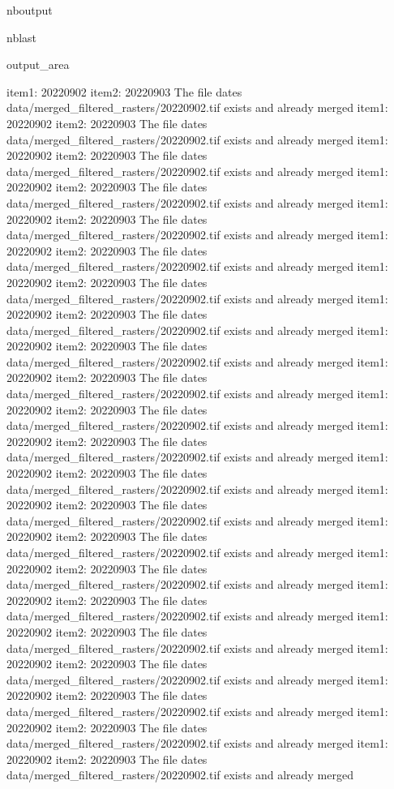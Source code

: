 \documentclass[letterpaper,10pt]{sphinxmanual}
\begin{document}
\begin{sphinxuseclass}{nboutput}
\begin{sphinxuseclass}{nblast}
{\begin{sphinxuseclass}{output_area}
\begin{sphinxuseclass}{}
\begin{sphinxVerbatim}[commandchars=\\\{\}]
item1:  20220902
item2:  20220903
The file dates data/merged\_filtered\_rasters/20220902.tif exists and already merged
item1:  20220902
item2:  20220903
The file dates data/merged\_filtered\_rasters/20220902.tif exists and already merged
item1:  20220902
item2:  20220903
The file dates data/merged\_filtered\_rasters/20220902.tif exists and already merged
item1:  20220902
item2:  20220903
The file dates data/merged\_filtered\_rasters/20220902.tif exists and already merged
item1:  20220902
item2:  20220903
The file dates data/merged\_filtered\_rasters/20220902.tif exists and already merged
item1:  20220902
item2:  20220903
The file dates data/merged\_filtered\_rasters/20220902.tif exists and already merged
item1:  20220902
item2:  20220903
The file dates data/merged\_filtered\_rasters/20220902.tif exists and already merged
item1:  20220902
item2:  20220903
The file dates data/merged\_filtered\_rasters/20220902.tif exists and already merged
item1:  20220902
item2:  20220903
The file dates data/merged\_filtered\_rasters/20220902.tif exists and already merged
item1:  20220902
item2:  20220903
The file dates data/merged\_filtered\_rasters/20220902.tif exists and already merged
item1:  20220902
item2:  20220903
The file dates data/merged\_filtered\_rasters/20220902.tif exists and already merged
item1:  20220902
item2:  20220903
The file dates data/merged\_filtered\_rasters/20220902.tif exists and already merged
item1:  20220902
item2:  20220903
The file dates data/merged\_filtered\_rasters/20220902.tif exists and already merged
item1:  20220902
item2:  20220903
The file dates data/merged\_filtered\_rasters/20220902.tif exists and already merged
item1:  20220902
item2:  20220903
The file dates data/merged\_filtered\_rasters/20220902.tif exists and already merged
item1:  20220902
item2:  20220903
The file dates data/merged\_filtered\_rasters/20220902.tif exists and already merged
item1:  20220902
item2:  20220903
The file dates data/merged\_filtered\_rasters/20220902.tif exists and already merged
item1:  20220902
item2:  20220903
The file dates data/merged\_filtered\_rasters/20220902.tif exists and already merged
item1:  20220902
item2:  20220903
The file dates data/merged\_filtered\_rasters/20220902.tif exists and already merged
item1:  20220902
item2:  20220903
The file dates data/merged\_filtered\_rasters/20220902.tif exists and already merged
item1:  20220902
item2:  20220903
The file dates data/merged\_filtered\_rasters/20220902.tif exists and already merged
item1:  20220902
item2:  20220903
The file dates data/merged\_filtered\_rasters/20220902.tif exists and already merged

\end{sphinxVerbatim}
\end{sphinxuseclass}
\end{sphinxuseclass}}
\end{sphinxuseclass}
\end{sphinxuseclass}
\end{document}
